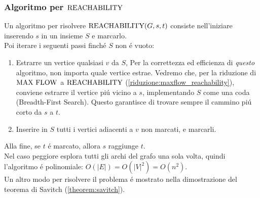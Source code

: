 \subsubsection{Algoritmo per $\text{REACHABILITY}$}
Un algoritmo per risolvere $\text{REACHABILITY}(G, s, t)$ consiste nell'iniziare inserendo $s$ in un insieme $S$ e marcarlo. \\
Poi iterare i seguenti passi finché $S$ non é vuoto:
\begin{enumerate}
    \item Estrarre un vertice qualsiasi $v$ da $S$,
        \subitem Per la correttezza ed efficienza di \textit{questo} algoritmo, non importa quale vertice estrae. 
        Vedremo che, per la riduzione di $\text{MAX FLOW}$ a $\text{REACHABILITY}$ 
        (\ref{riduzione:maxflow_reachability}), 
        conviene estrarre il vertice piú vicino a $s$,
        implementando $S$ come una coda (Breadth-First Search).
        Questo garantisce di trovare sempre il cammino piú corto da $s$ a $t$.
    \item Inserire in $S$ tutti i vertici adiacenti a $v$ non marcati, e marcarli.
\end{enumerate}
Alla fine, se $t$ é marcato, allora $s$ raggiunge $t$. \\
Nel caso peggiore esplora tutti gli archi del grafo una sola volta, quindi l'algoritmo é polinomiale: $O(|E|) = O(|V|^2) = O(n^2)$. \\

Un altro modo per risolvere il problema é mostrato nella dimostrazione del teorema di Savitch (\ref{theorem:savitch}). \\


\newpage
